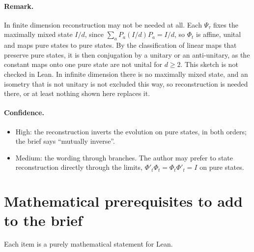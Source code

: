 \documentclass[11pt]{article}
\begin{document}
\paragraph{Remark.} In finite dimension reconstruction may not be needed at all. Each $\Psi_\tau$
fixes the maximally mixed state $I/d$, since $\sum_a P_a(I/d)P_a = I/d$, so $\Phi_t$ is affine,
unital and maps pure states to pure states. By the classification of linear maps that preserve
pure states, it is then conjugation by a unitary or an anti-unitary, as the constant maps onto one
pure state are not unital for $d \ge 2$. This sketch is not checked in Lean. In infinite dimension
there is no maximally mixed state, and an isometry that is not unitary is not excluded this way,
so reconstruction is needed there, or at least nothing shown here replaces it.

\paragraph{Confidence.}
\begin{itemize}
\item High: the reconstruction inverts the evolution on pure states, in both orders; the brief
  says ``mutually inverse''.
\item Medium: the wording through branches. The author may prefer to state reconstruction directly
  through the limits, $\Phi'_t\Phi_t = \Phi_t\Phi'_t = I$ on pure states.
\end{itemize}

\section{Mathematical prerequisites to add to the brief}

Each item is a purely mathematical statement for Lean.
\end{document}
